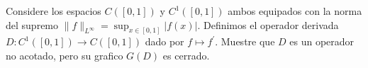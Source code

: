  Considere los espacios $C([0,1])$ y $C^1([0,1])$ ambos equipados con la norma del supremo $\|f\|_{L^\infty}=\displaystyle\sup_{x\in[0,1]}|f(x)|.$ Definimos el operador derivada $D:C^1([0,1])\to C([0,1])$ dado por $f\mapsto f^\prime.$ Muestre que $D$ es un operador no acotado, pero su grafico $G(D)$ es cerrado.